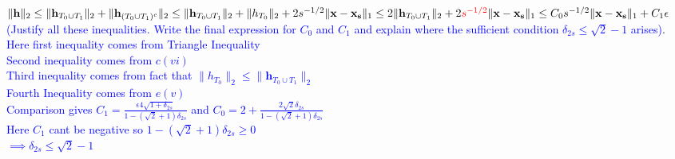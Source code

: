 \documentclass[11pt]{article}
\begin{document}
\begin{enumerate}
\begin{enumerate}
$\|\mathbf{h}\|_2 \leq \|\mathbf{h}_{T_0 \cup T_1}\|_2 + \|\mathbf{h}_{(T_0 \cup T_1)^c}\|_2 \leq \|\mathbf{h}_{T_0 \cup T_1}\|_2 + \|h_{T_0}\|_2 + 2s^{-1/2}\|\mathbf{x}-\mathbf{x_s}\|_1 \\
\leq 2 \|\mathbf{h}_{T_0 \cup T_1}\|_2 + 2\textcolor{red}{s^{-1/2}}\|\mathbf{x}-\mathbf{x_s}\|_1 \leq C_0 s^{-1/2} \|\mathbf{x}-\mathbf{x_s}\|_1 + C_1 \epsilon$ \textcolor{blue}{(Justify all these inequalities. Write the final expression for $C_0$ and $C_1$ and explain where the sufficient condition $\delta_{2s} \leq \sqrt{2}-1$ arises)}.\\
\textcolor{blue}{Here first inequality comes from Triangle Inequality\\
Second inequality comes from $c(vi)$\\
Third inequality comes from fact that $\|h_{T_0}\|_2 \leq \|\mathbf{h}_{T_0 \cup T_1}\|_2 $\\
Fourth Inequality comes from $e(v)$\\
Comparison gives $C_1 = \frac{\epsilon4\sqrt{1+\delta_{2s}}}{1-(\sqrt{2}+1)\delta_{2s}}$ and $C_0 = 2+\frac{2\sqrt{2}\delta_{2s}}{1-(\sqrt{2}+1)\delta_{2s}}$\\
Here $C_1$ cant be negative so $1-(\sqrt{2}+1)\delta_{2s} \geq 0$\\
$\implies \delta_{2s} \leq \sqrt{2}-1$}
\end{enumerate}


\end{enumerate}
\end{document}
